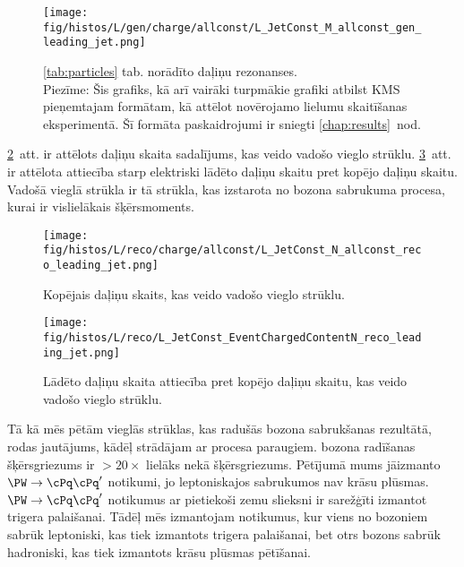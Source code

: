   \begin{figure}[hbtp]
    \centering
     \def\twidth{0.45}
    \texttt{[image: fig/histos/L/gen/charge/allconst/L\_JetConst\_M\_allconst\_gen\_leading\_jet.png]}
    \caption{\protect\ref{tab:particles} tab. norādīto daļiņu rezonanses. \\
    \footnotesize Piezīme: Šis grafiks, kā arī vairāki turpmākie grafiki atbilst KMS pieņemtajam formātam, kā attēlot novērojamo lielumu skaitīšanas eksperimentā. Šī formāta paskaidrojumi ir sniegti \protect\ref{chap:results}~nod.}
    \label{fig:mass_resonances}
  \end{figure}

\ref{fig:number}~att. ir attēlots daļiņu skaita sadalījums, kas veido vadošo vieglo strūklu. \ref{fig:charged_content}~att. ir attēlota attiecība starp elektriski lādēto daļiņu skaitu pret kopējo daļiņu skaitu. Vadošā vieglā strūkla ir tā strūkla, kas izstarota no \PW bozona sabrukuma procesa, kurai ir vislielākais šķērsmoments.

  \begin{figure}[hbtp]
    \centering
     \def\twidth{0.45}
    \texttt{[image: fig/histos/L/reco/charge/allconst/L\_JetConst\_N\_allconst\_reco\_leading\_jet.png]}
    \caption{Kopējais daļiņu skaits, kas veido vadošo vieglo strūklu.}
    \label{fig:number}

\end{figure}
     \begin{figure}[hbtp]
     \centering
     \def\twidth{0.45}
     \texttt{[image: fig/histos/L/reco/L\_JetConst\_EventChargedContentN\_reco\_leading\_jet.png]}
     \caption{Lādēto daļiņu skaita attiecība pret kopējo daļiņu skaitu, kas veido vadošo vieglo strūklu.}
  \label{fig:charged_content}
   \end{figure}

Tā kā mēs pētām vieglās strūklas, kas radušās \PW bozona sabrukšanas rezultātā, rodas jautājums, kādēļ strādājam ar \ttbar procesa paraugiem. \PW bozona radīšanas šķērsgriezums ir $>20\times$ lielāks nekā \ttbar šķērsgriezums. Pētījumā mums jāizmanto $\PW\rightarrow\cPq\cPq'$ notikumi, jo leptoniskajos sabrukumos nav krāsu plūsmas. $\PW\rightarrow\cPq\cPq'$ notikumus ar pietiekoši zemu \pt slieksni ir sarežģīti izmantot trigera palaišanai. Tādēļ mēs izmantojam \ttbar notikumus, kur viens no \PW bozoniem sabrūk leptoniski, kas tiek izmantots trigera palaišanai, bet otrs \PW bozons sabrūk hadroniski, kas tiek izmantots krāsu plūsmas pētīšanai.

